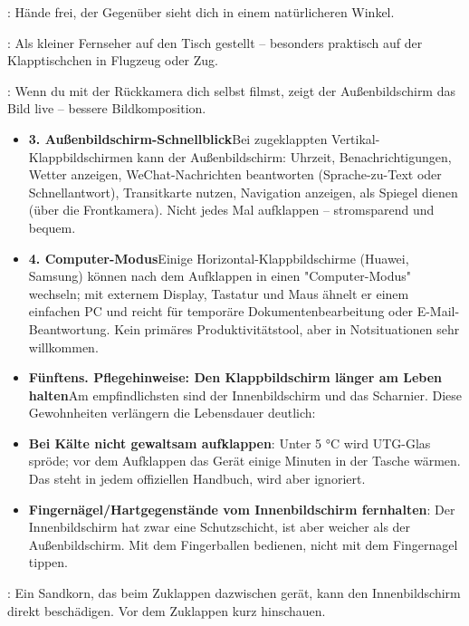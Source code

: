 
: Hände frei, der Gegenüber sieht dich in einem natürlicheren Winkel.


: Als kleiner Fernseher auf den Tisch gestellt – besonders praktisch auf der Klapptischchen in Flugzeug oder Zug.


: Wenn du mit der Rückkamera dich selbst filmst, zeigt der Außenbildschirm das Bild live – bessere Bildkomposition.

\begin{itemize}
  \item \textbf{3. Außenbildschirm-Schnellblick}Bei zugeklappten Vertikal-Klappbildschirmen kann der Außenbildschirm: Uhrzeit, Benachrichtigungen, Wetter anzeigen, WeChat-Nachrichten beantworten (Sprache-zu-Text oder Schnellantwort), Transitkarte nutzen, Navigation anzeigen, als Spiegel dienen (über die Frontkamera). Nicht jedes Mal aufklappen – stromsparend und bequem.
  \item \textbf{4. Computer-Modus}Einige Horizontal-Klappbildschirme (Huawei, Samsung) können nach dem Aufklappen in einen "Computer-Modus" wechseln; mit externem Display, Tastatur und Maus ähnelt er einem einfachen PC und reicht für temporäre Dokumentenbearbeitung oder E-Mail-Beantwortung. Kein primäres Produktivitätstool, aber in Notsituationen sehr willkommen.
  \item \textbf{Fünftens. Pflegehinweise: Den Klappbildschirm länger am Leben halten}Am empfindlichsten sind der Innenbildschirm und das Scharnier. Diese Gewohnheiten verlängern die Lebensdauer deutlich:
  \item \textbf{Bei Kälte nicht gewaltsam aufklappen}: Unter 5 °C wird UTG-Glas spröde; vor dem Aufklappen das Gerät einige Minuten in der Tasche wärmen. Das steht in jedem offiziellen Handbuch, wird aber ignoriert.
  \item \textbf{Fingernägel/Hartgegenstände vom Innenbildschirm fernhalten}: Der Innenbildschirm hat zwar eine Schutzschicht, ist aber weicher als der Außenbildschirm. Mit dem Fingerballen bedienen, nicht mit dem Fingernagel tippen.
\end{itemize}


: Ein Sandkorn, das beim Zuklappen dazwischen gerät, kann den Innenbildschirm direkt beschädigen. Vor dem Zuklappen kurz hinschauen.

